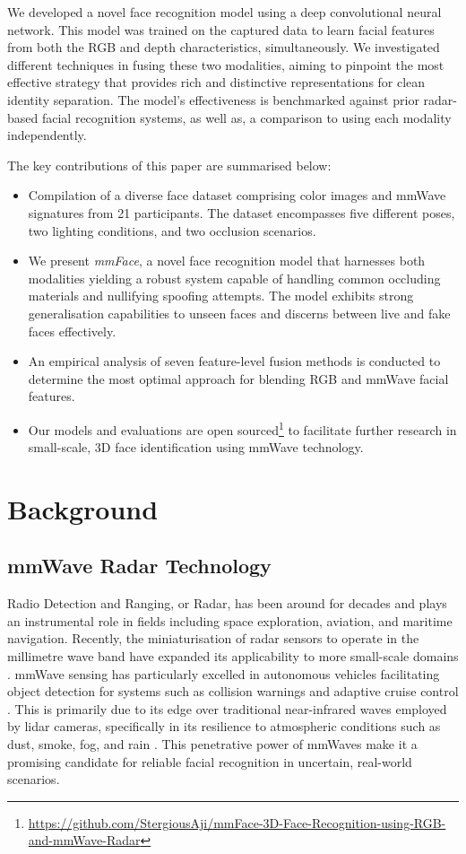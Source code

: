 \documentclass{mpaper}
\begin{document}
We developed a novel face recognition model using a deep convolutional neural network. This model was trained on the captured data to learn facial features from both the RGB and depth characteristics, simultaneously. We investigated different techniques in fusing these two modalities, aiming to pinpoint the most effective strategy that provides rich and distinctive representations for clean identity separation. The model's effectiveness is benchmarked against prior radar-based facial recognition systems, as well as, a comparison to using each modality independently.

The key contributions of this paper are summarised below:
\vspace{-0.48cm}
\begin{itemize}
    \itemsep 0.08cm
    \item Compilation of a diverse face dataset comprising color images and mmWave signatures from 21 participants. The dataset encompasses five different poses, two lighting conditions, and two occlusion scenarios.
    \item We present \emph{mmFace}, a novel face recognition model that harnesses both modalities yielding a robust system capable of handling common occluding materials and nullifying spoofing attempts. The model exhibits strong generalisation capabilities to unseen faces and discerns between live and fake faces effectively.
    \item An empirical analysis of seven feature-level fusion methods is conducted to determine the most optimal approach for blending RGB and mmWave facial features.
    \item Our models and evaluations are open sourced\footnote{\url{https://github.com/StergiousAji/mmFace-3D-Face-Recognition-using-RGB-and-mmWave-Radar}} to facilitate further research in small-scale, 3D face identification using mmWave technology.
\end{itemize}
\vspace{0.1cm}

\section{Background}
\subsection{mmWave Radar Technology}
Radio Detection and Ranging, or Radar, has been around for decades and plays an instrumental role in fields including space exploration, aviation, and maritime navigation. Recently, the miniaturisation of radar sensors to operate in the millimetre wave band have expanded its applicability to more small-scale domains \cite{soumya2023recent}. mmWave sensing has particularly excelled in autonomous vehicles facilitating object detection for systems such as collision warnings and adaptive cruise control \cite{dfrobot}. This is primarily due to its edge over traditional near-infrared waves employed by lidar cameras, specifically in its resilience to atmospheric conditions such as dust, smoke, fog, and rain \cite{cadenceblog2022}. This penetrative power of mmWaves make it a promising candidate for reliable facial recognition in uncertain, real-world scenarios. 
\end{document}
